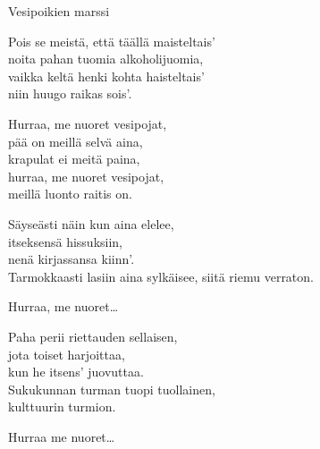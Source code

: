 \begin{song}{Vesipoikien marssi}

	
	
	Pois se meistä, että täällä maisteltais'\\
	noita pahan tuomia alkoholijuomia,\\
	vaikka keltä henki kohta haisteltais'\\
	niin huugo raikas sois'.

	Hurraa, me nuoret vesipojat,\\
	pää on meillä selvä aina,\\
	krapulat ei meitä paina,\\
	hurraa, me nuoret vesipojat,\\
	meillä luonto raitis on.

	Säyseästi näin kun aina elelee,\\
	itseksensä hissuksiin,\\
	nenä kirjassansa kiinn'.\\
	Tarmokkaasti lasiin aina sylkäisee,
	siitä riemu verraton.

	Hurraa, me nuoret\ldots
	
	Paha perii riettauden sellaisen,\\
	jota toiset harjoittaa,\\
	kun he itsens' juovuttaa.\\
	Sukukunnan turman tuopi tuollainen,\\
	kulttuurin turmion.

	Hurraa me nuoret\ldots


\end{song}
